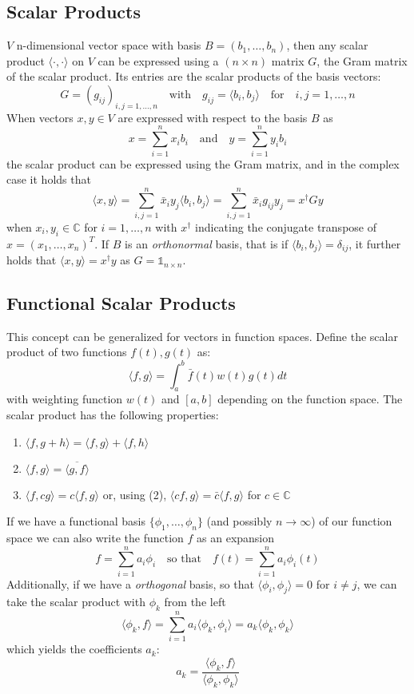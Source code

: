 \subsection{Scalar Products}
$V$ n-dimensional vector space with basis $B = (b_1, \dots, b_n)$, then any scalar product $\langle\cdot,\cdot\rangle$ on $V$ can be expressed using a $(n \times n)$ matrix $G$, the Gram matrix of the scalar product. Its entries are the scalar products of the basis vectors:
$$ G = (g_{ij})_{i,j=1,\dots,n} \quad \text{with} 
  \quad g_{ij} = \langle b_i, b_j \rangle \quad \text{for}
  \quad i,j = 1,\dots, n $$
When vectors $x,y \in V$ are expressed with respect to the basis $B$ as
$$ x = \sum_{i=1}^n x_i b_i \quad \text{and} \quad y = \sum_{i=1}^n y_i b_i $$
the scalar product can be expressed using the Gram matrix, and in the complex case it holds that
$$ \langle x, y \rangle = \sum^n_{i,j=1} \bar{x}_i y_j \langle b_i, b_j \rangle 
  =\sum^n_{i,j=1} \bar{x}_i g_{ij} y_j = x^\dagger G y$$
when $x_i,y_i \in \mathbb{C}$ for $i=1,\dots,n$ with $x^\dagger$ indicating the conjugate transpose of $x = (x_1, \dots, x_n)^T$. If $B$ is an \textit{orthonormal} basis, that is if $\langle b_i, b_j \rangle = \delta_{ij}$, it further holds that $\langle x,y \rangle = x^\dagger y$ as $G = \mathbb{1}_{n \times n}$.


\subsection{Functional Scalar Products}
This concept can be generalized for vectors in function spaces. Define the scalar product of two functions $f(t), g(t)$ as:
$$ \langle f, g \rangle = \int_a^b \bar{f}(t) w(t) g(t) dt $$
with weighting function $w(t)$ and $[a,b]$ depending on the function space. The scalar product has the following properties:
\begin{enumerate}
    \item $\langle f, g + h \rangle = \langle f,g \rangle + \langle f,h \rangle$
    \item $\langle f, g \rangle = \overline{\langle g, f \rangle}$
    \item $\langle f, cg \rangle = c \langle f,g \rangle$ or, using (2),
        $\langle cf,g \rangle = \bar{c} \langle f,g \rangle$ for $c \in \mathbb{C}$
\end{enumerate}
If we have a functional basis $\{\phi_1, \dots , \phi_n\}$ (and possibly $n \to \infty$) of our function space we can also write the function $f$ as an expansion
$$ f = \sum_{i=1}^n a_i \phi_i \quad \text{so that} \quad
  f(t) = \sum_{i=1}^n a_i \phi_i (t)$$
Additionally, if we have a \textit{orthogonal} basis, so that $\langle \phi_i, \phi_j \rangle = 0$ for $i \neq j$, we can take the scalar product with $\phi_k$ from the left
$$ \langle \phi_k, f \rangle = \sum_{i=1}^n a_i \langle \phi_k, \phi_i \rangle =
  a_k \langle \phi_k, \phi_k \rangle $$
which yields the coefficients $a_k$: 
$$ a_k = \frac{\langle \phi_k, f \rangle}{\langle \phi_k, \phi_k \rangle}$$


